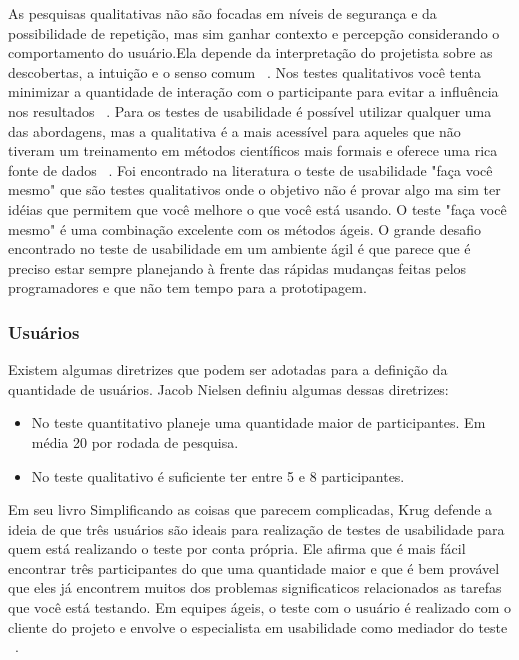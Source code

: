 	As pesquisas qualitativas não são focadas em níveis de segurança e da possibilidade de repetição, mas sim ganhar contexto e percepção considerando o comportamento do usuário.Ela depende da interpretação do projetista sobre as descobertas, a intuição e o senso comum ~\cite{unger2009}.
	Nos testes qualitativos você tenta minimizar a quantidade de interação com o participante para evitar a influência nos resultados ~\cite{krug2010}.
	Para os testes de usabilidade é possível utilizar qualquer uma das abordagens, mas a qualitativa é a mais acessível para aqueles que não tiveram um treinamento em métodos científicos mais formais e oferece uma rica fonte de dados ~\cite{unger2009}.
	Foi encontrado na literatura o teste de usabilidade "faça você mesmo" que são testes qualitativos onde o objetivo não é provar algo ma sim ter idéias que permitem que você melhore o que você está usando.
	O teste "faça você mesmo" é uma combinação excelente com os métodos ágeis. 
	O grande desafio encontrado no teste de usabilidade em um ambiente ágil é que parece que é preciso estar sempre planejando à frente das rápidas mudanças feitas pelos programadores e que não tem tempo para a prototipagem.
	
\subsubsection {Usuários}

	Existem algumas diretrizes que podem ser adotadas para a definição da quantidade de usuários. Jacob Nielsen definiu algumas dessas diretrizes:

\begin{itemize}
\item No teste quantitativo planeje uma quantidade maior de participantes. Em média 20 por rodada de pesquisa.
\item No teste qualitativo é suficiente ter entre 5 e 8 participantes.
\end{itemize}

	Em seu livro Simplificando as coisas que parecem complicadas, Krug defende a ideia de que três usuários são ideais para realização de testes de usabilidade para quem está realizando o teste por conta própria. Ele afirma que é mais fácil encontrar três participantes do que uma quantidade maior e que é bem provável que eles já encontrem muitos dos problemas significaticos relacionados as tarefas que você está testando.
	Em equipes ágeis, o teste com o usuário é realizado com o cliente do projeto e envolve o especialista em usabilidade como mediador do teste ~\cite{santos2012}.

